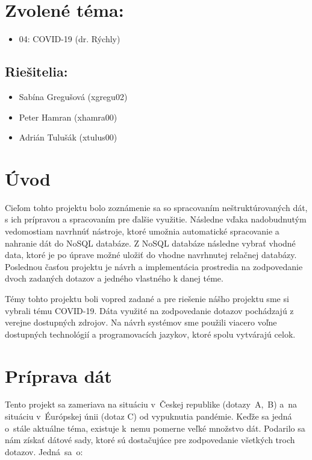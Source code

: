 \documentclass [11pt, a4paper]{article}
\begin{document}
\section*{Zvolené téma:} 
\begin{itemize}[noitemsep]
\item 04: COVID-19 (dr. Rýchly)
\end{itemize}


\subsection*{Riešitelia:}
\begin{itemize}[noitemsep]
\item Sabína Gregušová (xgregu02)
\item Peter Hamran (xhamra00)
\item Adrián Tulušák (xtulus00)
\end{itemize}

\section*{Úvod}
Cieľom tohto projektu bolo zoznámenie sa so spracovaním neštruktúrovaných dát, s ich prípravou a spracovaním pre ďalšie využitie. Následne vďaka nadobudnutým vedomostiam navrhnúť nástroje, ktoré umožnia automatické spracovanie a nahranie dát do NoSQL databáze. Z NoSQL databáze následne vybrať vhodné data, ktoré je po úprave možné uložiť do vhodne navrhnutej relačnej databázy. Poslednou časťou projektu je návrh a implementácia prostredia na zodpovedanie dvoch zadaných dotazov a jedného vlastného k danej téme. 

Témy tohto projektu boli vopred zadané a pre riešenie nášho projektu sme si vybrali tému COVID-19. Dáta využité na zodpovedanie dotazov pochádzajú z verejne dostupných zdrojov. Na návrh systémov sme použili viacero voľne dostupných technológií a programovacích jazykov, ktoré spolu vytvárajú celok. 
\section*{Príprava dát}

Tento projekt sa zameriava na situáciu v~Českej republike (dotazy~A,~B) a~na situáciu v~Éurópskej únii (dotaz C) od vypuknutia pandémie. Keďže sa jedná o~stále aktuálne téma, existuje k~nemu pomerne veľké množstvo dát. Podarilo sa nám získať dátové sady, ktoré sú dostačujúce pre zodpovedanie všetkých troch dotazov. Jedná~sa~o:
\end{document}
